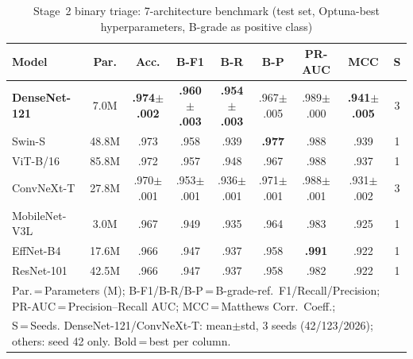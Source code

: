 \documentclass[conference]{IEEEtran}
\begin{document}
\begin{table}[t]
  \caption{Stage~2 binary triage: 7-architecture benchmark (test set, Optuna-best hyperparameters, B-grade as positive class)}
  \label{tab:stage2_results}
  \centering
  \renewcommand{\arraystretch}{0.95}\scriptsize
  \setlength{\tabcolsep}{4.2pt}
  \begin{tabular}{l c c c c c c c c}
    \toprule
    \textbf{Model} & \textbf{Par.} & \textbf{Acc.} & \textbf{B-F1} & \textbf{B-R} & \textbf{B-P} & \textbf{PR-AUC} & \textbf{MCC} & \textbf{S}\\
    \midrule
    \textbf{DenseNet-121} & 7.0M & \textbf{.974$\pm$.002} & \textbf{.960$\pm$.003} & \textbf{.954$\pm$.003} & .967$\pm$.005 & .989$\pm$.000 & \textbf{.941$\pm$.005} & 3\\
    Swin-S        & 48.8M & .973 & .958 & .939 & \textbf{.977} & .988 & .939 & 1\\
    ViT-B/16      & 85.8M & .972 & .957 & .948 & .967 & .988 & .937 & 1\\
    ConvNeXt-T    & 27.8M & .970$\pm$.001 & .953$\pm$.001 & .936$\pm$.001 & .971$\pm$.001 & .988$\pm$.001 & .931$\pm$.002 & 3\\
    MobileNet-V3L & 3.0M & .967 & .949 & .935 & .964 & .983 & .925 & 1\\
    EffNet-B4     & 17.6M & .966 & .947 & .937 & .958 & \textbf{.991} & .922 & 1\\
    ResNet-101    & 42.5M & .966 & .947 & .937 & .958 & .982 & .922 & 1\\
    \bottomrule
    \multicolumn{9}{l}{\footnotesize Par.\,=\,Parameters (M); B-F1/B-R/B-P\,=\,B-grade-ref.\ F1/Recall/Precision; PR-AUC\,=\,Precision--Recall AUC; MCC\,=\,Matthews Corr.\ Coeff.;}\\
    \multicolumn{9}{l}{\footnotesize S\,=\,Seeds. DenseNet-121/ConvNeXt-T: mean$\pm$std, 3 seeds (42/123/2026); others: seed 42 only. Bold\,=\,best per column.}
  \end{tabular}
\end{table}
\end{document}
